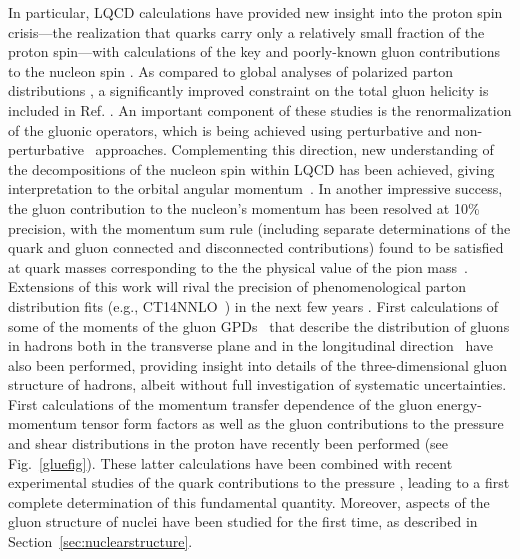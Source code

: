 In particular, LQCD calculations have provided new insight into the proton spin crisis---the realization that quarks carry only a relatively small fraction of the proton spin---with calculations of the key and poorly-known gluon contributions to the nucleon spin \cite{Alexandrou:2017oeh,Yang:2016plb}.  As compared to global analyses of polarized parton distributions \cite{deFlorian:2014yva}, a significantly improved constraint on the total gluon helicity is included in Ref. \cite{Yang:2016plb}. An important component of these studies is the renormalization of the gluonic operators, which is being achieved using  perturbative \cite{Glatzmaier:2014sya,Alexandrou:2017oeh} and non-perturbative~\cite{Yang:2018bft} approaches. Complementing this direction, new understanding of the decompositions of the nucleon spin within LQCD has been achieved, giving interpretation to the   orbital angular momentum~\cite{Engelhardt:2017miy}. 
%
In another impressive success, the gluon contribution to the nucleon's momentum has been resolved at 10\% precision, with the momentum sum rule (including separate determinations of the quark and gluon connected and disconnected contributions) found to be satisfied at quark masses corresponding to the the physical value of the pion mass~\cite{Alexandrou:2017oeh}. Extensions of this work will rival the precision of phenomenological parton distribution fits (e.g., CT14NNLO~\cite{Dulat:2015mca}) in the next few years \cite{Lin:2017snn}.
%
First calculations of some of the moments of the gluon GPDs~\cite{Diehl:2003ny} that describe the distribution of gluons in hadrons both in the transverse plane and in the longitudinal direction~\cite{Detmold:2016gpy,Detmold:2017oqb} have also been performed, providing  insight into details of the three-dimensional gluon structure of hadrons, albeit without full investigation of systematic uncertainties. 
First calculations of the momentum transfer dependence of the gluon energy-momentum tensor form factors as well as the gluon contributions to the pressure and shear distributions in the proton have recently been performed \cite{Shanahan:2018nnv,Shanahan:2018pib} (see Fig.~\ref{gluefig}). These latter calculations have been combined with recent experimental studies of the quark contributions to the pressure \cite{Burkert:2018bqq}, leading to a first complete determination of this fundamental quantity.
Moreover, aspects of the gluon structure of nuclei have been studied for the first time,  as described in Section~\ref{sec:nuclearstructure}.

